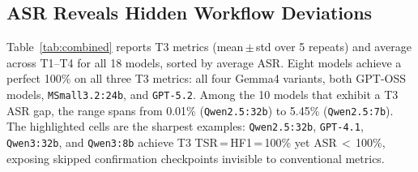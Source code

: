 \documentclass[runningheads]{llncs}
\begin{document}
\subsection{ASR Reveals Hidden Workflow Deviations}

Table~\ref{tab:combined} reports T3 metrics (mean\,$\pm$\,std over 5 repeats) and average across T1--T4 for all 18 models, sorted by average ASR. Eight models achieve a perfect 100\% on all three T3 metrics: all four Gemma4 variants, both GPT-OSS models, \texttt{MSmall3.2:24b}, and \texttt{GPT-5.2}. Among the 10 models that exhibit a T3 ASR gap, the range spans from 0.01\% (\texttt{Qwen2.5:32b}) to 5.45\% (\texttt{Qwen2.5:7b}). The \colorbox{yellow!30}{highlighted} cells are the sharpest examples: \texttt{Qwen2.5:32b}, \texttt{GPT-4.1}, \texttt{Qwen3:32b}, and \texttt{Qwen3:8b} achieve T3 TSR\,=\,HF1\,=\,100\% yet ASR\,$<$\,100\%, exposing skipped confirmation checkpoints invisible to conventional metrics.
\end{document}
